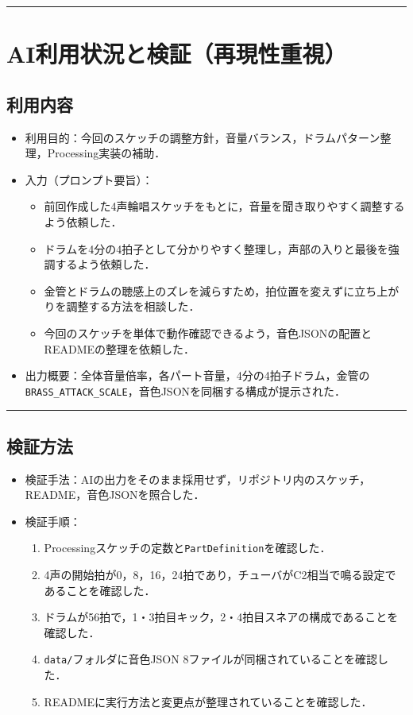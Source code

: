 \documentclass[uplatex,dvipdfmx,a4paper,11pt]{jsarticle}
\newcommand{\sectionrule}{\par\medskip\noindent\rule{\linewidth}{0.6pt}\par\medskip}
\begin{document}
\sectionrule

\section{AI利用状況と検証（再現性重視）}

\subsection{利用内容}

\begin{itemize}
  \item 利用目的：今回のスケッチの調整方針，音量バランス，ドラムパターン整理，Processing実装の補助．
  \item 入力（プロンプト要旨）：
    \begin{itemize}
      \item {}前回作成した4声輪唱スケッチをもとに，音量を聞き取りやすく調整するよう依頼した．
      \item {}ドラムを4分の4拍子として分かりやすく整理し，声部の入りと最後を強調するよう依頼した．
      \item {}金管とドラムの聴感上のズレを減らすため，拍位置を変えずに立ち上がりを調整する方法を相談した．
      \item {}今回のスケッチを単体で動作確認できるよう，音色JSONの配置とREADMEの整理を依頼した．
    \end{itemize}
  \item 出力概要：全体音量倍率，各パート音量，4分の4拍子ドラム，金管の\texttt{BRASS\_ATTACK\_SCALE}，音色JSONを同梱する構成が提示された．
\end{itemize}

\sectionrule

\subsection{検証方法}

\begin{itemize}
  \item 検証手法：AIの出力をそのまま採用せず，リポジトリ内のスケッチ，README，音色JSONを照合した．
  \item 検証手順：
    \begin{enumerate}
      \item {}Processingスケッチの定数と\texttt{PartDefinition}を確認した．
      \item {}4声の開始拍が0，8，16，24拍であり，チューバがC2相当で鳴る設定であることを確認した．
      \item {}ドラムが56拍で，1・3拍目キック，2・4拍目スネアの構成であることを確認した．
      \item {}\texttt{data/}フォルダに音色JSON 8ファイルが同梱されていることを確認した．
      \item {}READMEに実行方法と変更点が整理されていることを確認した．
    \end{enumerate}
\end{itemize}
\end{document}
